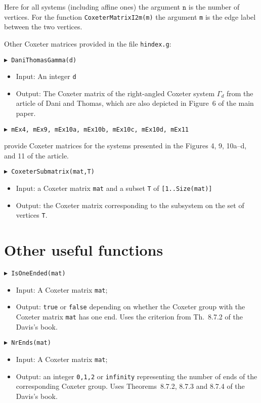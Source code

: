 \documentclass[10pt]{amsart}
\begin{document}
\bigskip
\noindent
Here for all systems (including affine ones) the argument $\mathtt n$ is the number of vertices. For the function {\tt CoxeterMatrixI2m(m)} the argument {\tt m} is the edge label between the two vertices.


\bigskip
\noindent
Other Coxeter matrices provided in the file {\tt hindex.g}:

\bigskip
\noindent
{\tt $\blacktriangleright$ DaniThomasGamma(d)}
\noindent 
\begin{itemize}
\item{} Input: An integer {\tt d}
\item{} Output: The Coxeter matrix of the right-angled Coxeter system $\Gamma_d$ from the article of Dani and Thomas, which are also depicted in Figure~6 of the main paper.
\end{itemize}


\bigskip
\noindent
{\tt $\blacktriangleright$ mEx4, mEx9, mEx10a, mEx10b, mEx10c, mEx10d, mEx11}

\noindent
provide Coxeter matrices for the systems presented in the Figures 4, 9, 10a--d, and 11 of the article.

\bigskip
\noindent
{\tt $\blacktriangleright$ CoxeterSubmatrix(mat,T)}
\noindent 
\begin{itemize}
\item{} Input: a Coxeter matrix {\tt mat} and a subset {\tt T} of {\tt [1..Size(mat)]}
\item{} Output: the Coxeter matrix corresponding to the subsystem on the set of vertices {\tt T}.
\end{itemize}




\bigskip
\section{Other useful functions}

\noindent
{\tt $\blacktriangleright$ IsOneEnded(mat)}
\noindent 
\begin{itemize}
\item{} Input: A Coxeter matrix {\tt mat};
\item{} Output: {\tt true} or {\tt false} depending on whether the Coxeter group with the Coxeter matrix {\tt mat} has one end. Uses the criterion from Th.~8.7.2 of the Davis's book.
\end{itemize}

\bigskip\noindent
{\tt $\blacktriangleright$ NrEnds(mat)}
\noindent 
\begin{itemize}
\item{} Input: A Coxeter matrix {\tt mat};
\item{} Output: an integer {\tt 0,1,2} or {\tt infinity} representing the number of ends of the corresponding Coxeter group. Uses Theorems~8.7.2, 8.7.3 and 8.7.4 of the Davis's book.
\end{itemize}
\end{document}
